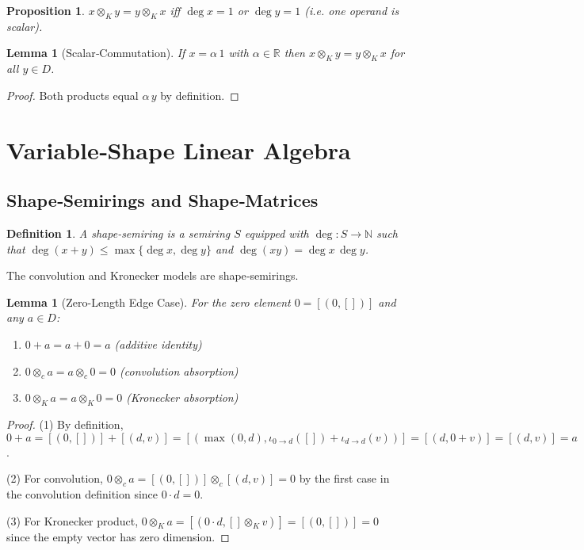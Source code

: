 \documentclass[11pt]{article}
\newtheorem{proposition}[theorem]{Proposition}
\newtheorem{lemma}[theorem]{Lemma}
\newtheorem{definition}[theorem]{Definition}
\begin{document}
\begin{proposition}\label{prop:commCase}
$x\otimes_K y = y\otimes_K x$ iff $\deg x =1$ or $\deg y =1$ (i.e. one operand is scalar).
\end{proposition}

\begin{lemma}[Scalar‑Commutation]\label{lem:scalarComm}
If $x=\alpha\,1$ with $\alpha\in\mathbb R$ then $x\otimes_K y = y\otimes_K x$ for all $y\in D$.
\end{lemma}
\begin{proof}
Both products equal $\alpha\,y$ by definition.\qedhere
\end{proof}

\section{Variable‑Shape Linear Algebra}
\subsection{Shape‑Semirings and Shape‑Matrices}
\begin{definition}
A \emph{shape‑semiring} is a semiring $S$ equipped with $\deg\colon S\to\mathbb N$ such that $\deg(x+y)\le\max\{\deg x,\deg y\}$ and $\deg(xy)=\deg x\,\deg y$.
\end{definition}

The convolution and Kronecker models are shape‑semirings.

\begin{lemma}[Zero-Length Edge Case]\label{lem:zeroLength}
For the zero element $0 = [(0,[])]$ and any $a \in D$:
\begin{enumerate}[leftmargin=2em]
\item $0 + a = a + 0 = a$ (additive identity)
\item $0 \otimes_c a = a \otimes_c 0 = 0$ (convolution absorption)  
\item $0 \otimes_K a = a \otimes_K 0 = 0$ (Kronecker absorption)
\end{enumerate}
\end{lemma}
\begin{proof}
(1) By definition, $0 + a = [(0,[])] + [(d,v)] = [(\max(0,d), \iota_{0 \to d}([]) + \iota_{d \to d}(v))] = [(d, 0 + v)] = [(d,v)] = a$.

(2) For convolution, $0 \otimes_c a = [(0,[])] \otimes_c [(d,v)] = 0$ by the first case in the convolution definition since $0 \cdot d = 0$.

(3) For Kronecker product, $0 \otimes_K a = [(0 \cdot d, [] \otimes_K v)] = [(0,[])] = 0$ since the empty vector has zero dimension.
\qedhere
\end{proof}
\end{document}
